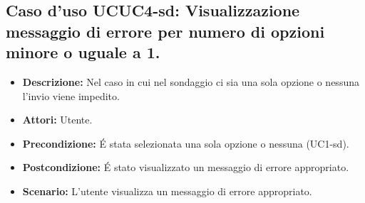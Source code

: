 \subsection{Caso d'uso UCUC4-sd: Visualizzazione messaggio di errore per numero di opzioni minore o uguale a 1.}
\begin{itemize}
\item[]\textbf{Descrizione:} Nel caso in cui nel sondaggio ci sia una sola opzione o nessuna l'invio viene impedito.
\item[]\textbf{Attori:} Utente. 
\item[]\textbf{Precondizione:} \'E stata selezionata una sola opzione o nessuna (UC1-sd). 
\item[]\textbf{Postcondizione:} \'E stato visualizzato un messaggio di errore appropriato. 
\item[]\textbf{Scenario:}
L'utente visualizza un messaggio di errore appropriato. 
\end{itemize}

\clearpage

